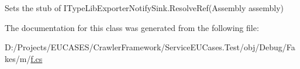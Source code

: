 Sets the stub of I\-Type\-Lib\-Exporter\-Notify\-Sink.\-Resolve\-Ref(\-Assembly assembly)



The documentation for this class was generated from the following file\-:\begin{DoxyCompactItemize}
\item 
D\-:/\-Projects/\-E\-U\-C\-A\-S\-E\-S/\-Crawler\-Framework/\-Service\-E\-U\-Cases.\-Test/obj/\-Debug/\-Fakes/m/\hyperlink{m_2f_8cs}{f.\-cs}\end{DoxyCompactItemize}

